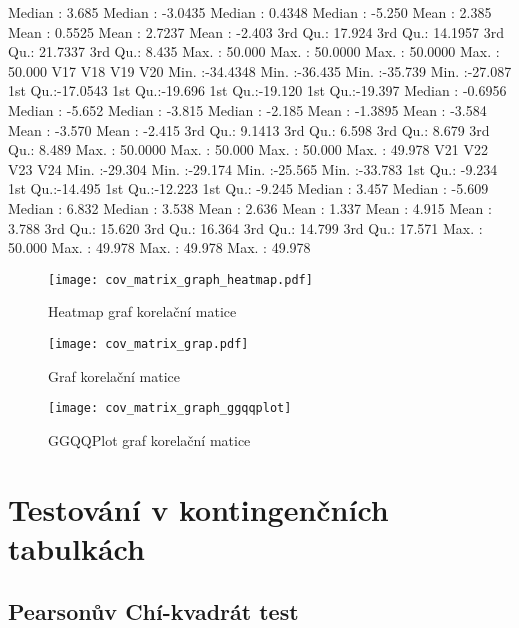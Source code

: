 \documentclass[a4paper]{ article}
\begin{document}
\begin{table}[H]
\begin{Schunk}
\begin{Soutput}
 Median :  3.685   Median : -3.0435   Median :  0.4348   Median : -5.250  
 Mean   :  2.385   Mean   :  0.5525   Mean   :  2.7237   Mean   : -2.403  
 3rd Qu.: 17.924   3rd Qu.: 14.1957   3rd Qu.: 21.7337   3rd Qu.:  8.435  
 Max.   : 50.000   Max.   : 50.0000   Max.   : 50.0000   Max.   : 50.000  
      V17                V18               V19               V20         
 Min.   :-34.4348   Min.   :-36.435   Min.   :-35.739   Min.   :-27.087  
 1st Qu.:-17.0543   1st Qu.:-19.696   1st Qu.:-19.120   1st Qu.:-19.397  
 Median : -0.6956   Median : -5.652   Median : -3.815   Median : -2.185  
 Mean   : -1.3895   Mean   : -3.584   Mean   : -3.570   Mean   : -2.415  
 3rd Qu.:  9.1413   3rd Qu.:  6.598   3rd Qu.:  8.679   3rd Qu.:  8.489  
 Max.   : 50.0000   Max.   : 50.000   Max.   : 50.000   Max.   : 49.978  
      V21               V22               V23               V24         
 Min.   :-29.304   Min.   :-29.174   Min.   :-25.565   Min.   :-33.783  
 1st Qu.: -9.234   1st Qu.:-14.495   1st Qu.:-12.223   1st Qu.: -9.245  
 Median :  3.457   Median : -5.609   Median :  6.832   Median :  3.538  
 Mean   :  2.636   Mean   :  1.337   Mean   :  4.915   Mean   :  3.788  
 3rd Qu.: 15.620   3rd Qu.: 16.364   3rd Qu.: 14.799   3rd Qu.: 17.571  
 Max.   : 50.000   Max.   : 49.978   Max.   : 49.978   Max.   : 49.978  
\end{Soutput}
\end{Schunk}
\end{table}

\begin{figure}[H]
\centering

\texttt{[image: cov\_matrix\_graph\_heatmap.pdf]}
\caption{Heatmap graf korelační matice}

\texttt{[image: cov\_matrix\_grap.pdf]}
\caption{Graf korelační matice}
\end{figure}

\begin{figure}[H]
\centering
\texttt{[image: cov\_matrix\_graph\_ggqqplot]}
\caption{GGQQPlot graf korelační matice}

\end{figure}

\section{Testování v kontingenčních tabulkách}
\subsection{Pearsonův Chí-kvadrát test}
\end{document}
